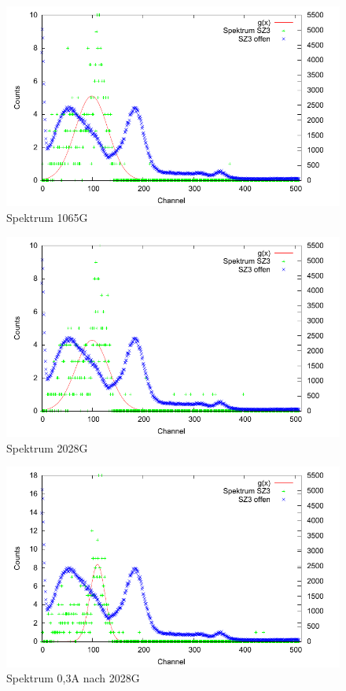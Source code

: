 \begin{figure}
 \includegraphics[width=\textwidth]{Graphen/quench/spektrum_1065.pdf}
 \caption{Spektrum 1065G}
\end{figure}


\begin{figure}
 \includegraphics[width=\textwidth]{Graphen/quench/spektrum_2028.pdf}
 \caption{Spektrum 2028G}
\end{figure}


\begin{figure}
 \includegraphics[width=\textwidth]{Graphen/quench/spektrum_0-3_nach_2028.pdf}
 \caption{Spektrum 0,3A nach 2028G}
\end{figure}


